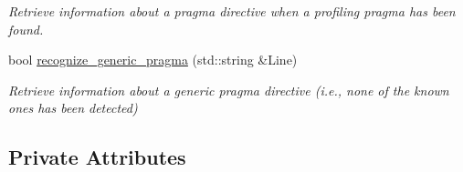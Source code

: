 \begin{DoxyCompactItemize}
\begin{DoxyCompactList}\small\item\em Retrieve information about a pragma directive when a profiling pragma has been found. \end{DoxyCompactList}\item 
bool \hyperlink{classPragmaParser_ac119f35e2a4b60c2f332305025b64ad5}{recognize\+\_\+generic\+\_\+pragma} (std\+::string \&Line)
\begin{DoxyCompactList}\small\item\em Retrieve information about a generic pragma directive (i.\+e., none of the known ones has been detected) \end{DoxyCompactList}\end{DoxyCompactItemize}
\subsection*{Private Attributes}
